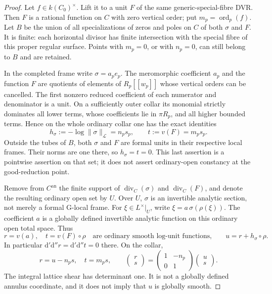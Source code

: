 \begin{proof}
Let \(f\in k(C_0)^\times\). Lift it to a unit \(F\) of the
same generic-special-fibre DVR. Then \(F\) is a rational
function on \(C\) with zero vertical order; put
\(m_p=\operatorname{ord}_p(f)\). Let \(B\) be the union of
all specializations of zeros and poles on \(C\) of both
\(\sigma\) and \(F\). It is finite: each horizontal divisor
has finite intersection with the special fibre of this
proper regular surface. Points with \(m_p=0\), or with
\(n_p=0\), can still belong to \(B\) and are retained.

In the completed frame write \(\sigma=a_pe_p\).
The meromorphic coefficient \(a_p\) and the function \(F\)
are quotients of elements of \(R_p[[w_p]]\) whose vertical
orders can be cancelled. The first nonzero reduced
coefficient of each numerator and denominator is a unit.
On a sufficiently outer collar its monomial strictly
dominates all lower terms, whose coefficients lie in
\(\pi R_p\), and all higher bounded terms. Hence on the
whole ordinary collar one has the exact identities
\begin{equation}
\label{eq:p213-torsor-two-slopes}
 h_\sigma:=-\log\|\sigma\|_{\mathcal L}=n_ps_p,
 \qquad t:=v(F)=m_ps_p .
\end{equation}
Outside the tubes of \(B\), both \(\sigma\) and \(F\) are
formal units in their respective local frames. Their
norms are one there, so \(h_\sigma=t=0\).
This last assertion is a pointwise assertion on that
set; it does not assert ordinary-open constancy at the
good-reduction point.

Remove from \(C^{\mathrm{an}}\) the finite support of
\(\operatorname{div}_C(\sigma)\) and
\(\operatorname{div}_C(F)\), and denote the resulting
ordinary open set by \(U\). Over \(U\), \(\sigma\) is
an invertible analytic section, not merely a formal
G-local frame. For \(\xi\in L^\times|_U\), write
\(\xi=a\,\sigma(\rho(\xi))\). The coefficient \(a\)
is a globally defined invertible analytic function
on this ordinary open total space. Thus
\[
 r=v(a),\quad t=v(F)\circ\rho
 \quad\text{are ordinary smooth log-unit functions,}
 \qquad u=r+h_\sigma\circ\rho.
\]
In particular \(\mathrm d'\mathrm d''r
=\mathrm d'\mathrm d''t=0\) there. On the collar,
\begin{equation}
\label{eq:p213-torsor-shear}
 r=u-n_ps,\quad t=m_ps,\qquad
 \begin{pmatrix}r\\s\end{pmatrix}
 =\begin{pmatrix}1&-n_p\\0&1\end{pmatrix}
   \begin{pmatrix}u\\s\end{pmatrix}.
\end{equation}
The integral lattice shear has determinant one.
It is not a globally defined annulus coordinate, and
it does not imply that \(u\) is globally smooth.


\end{proof}
